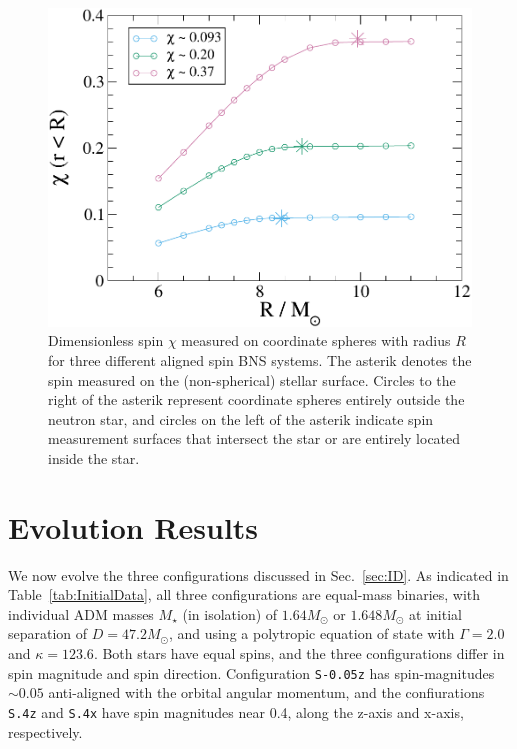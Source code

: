 \begin{figure}
\includegraphics[width=0.95\columnwidth]{chap2/ChiVR}
\caption[Dimensionless spin measured as measured on different coordinate spheres.]{{\label{fig:ChiVR}}Dimensionless spin $\chi$ measured on
  coordinate spheres with radius $R$ for three different aligned spin
  BNS systems. The asterik denotes the spin measured on the
  (non-spherical) stellar surface. Circles to the right of the
  asterik represent coordinate spheres entirely outside the neutron
  star, and circles on the left of the asterik indicate spin
  measurement surfaces that intersect the star or are entirely located
  inside the star.}
\end{figure}



\section{Evolution Results}
\label{sec:EvolutionResults}

We now evolve the three configurations discussed in Sec.~\ref{sec:ID}.
As indicated in Table~\ref{tab:InitialData}, all three configurations
are equal-mass binaries, with individual ADM masses $M_\star$ (in
isolation) 
of $1.64M_{\odot}$ or $1.648M_{\odot}$ at initial separation of
$D=47.2M_\odot$, and using a polytropic equation of state with
$\Gamma=2.0$ and $\kappa=123.6$. Both stars have equal spins, and the
three configurations differ in spin magnitude and spin direction.
Configuration {\tt S-0.05z} has spin-magnitudes $\sim 0.05$ anti-aligned
with the orbital angular momentum, and the confiurations {\tt S.4z} and {\tt S.4x}
have spin magnitudes near 0.4, along the z-axis and x-axis,
respectively.

